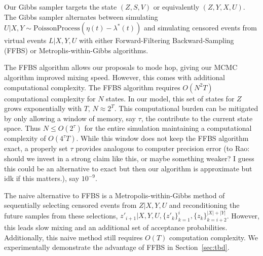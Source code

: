\documentclass[11pt]{article}
\newcommand{\algrule}[1][.2pt]{\par\vskip.5\baselineskip\hrule height #1\par\vskip.5\baselineskip}
\begin{document}
Our Gibbs sampler targets the state $(Z,S,V)$ or equivalently $(Z,Y,X,U)$. The Gibbs sampler alternates between simulating $U|X,Y \sim \text{PoissonProcess}(\eta(t) - \lambda^*(t))$ and simulating censored events from virtual events $L|X,Y,U$ with either Forward-Filtering Backward-Sampling (FFBS) or Metroplis-within-Gibbs algorithms. 


The FFBS algorithm allows our proposals to mode hop, giving our MCMC algorithm improved mixing speed. However, this comes with additional computational complexity. The FFBS algorithm requires $O(N^2T)$ computational complexity for $N$ states. In our model, this set of states for $Z$ grows exponentially with $T$, $N \approx 2^T$. This computational burden can be mitigated by only allowing a window of memory, say $\tau$, the contribute to the current state space. Thus $N \leq O(2^\tau)$ for the entire simulation maintaining a computational complexity of $O(4^{\tau} T)$. While this window does not keep the FFBS algorithm exact, a properly set $\tau$ provides analogous to computer precision error (to Rao: should we invest in a strong claim like this, or maybe something weaker? I guess this could be an alternative to exact but then our algorithm is approximate but idk if this matters.), say $10^{-9}$.


The naive alternative to FFBS is a Metropolis-within-Gibbs method of sequentially selecting censored events from $Z|X,Y,U$ and reconditioning the future samples from these selections, $z'_{i+1} | X,Y,U,\{z'_k\}_{k=1}^i, \{z_k\}_{k=i+2}^{|X|+|Y|}$. However, this leads slow mixing and an additional set of acceptance probabilities. Additionally, this naive method still requires $O(T)$ computation complexity. We experimentally demonstrate the advantage of FFBS in Section~\ref{sec:tbd}.



\end{document}
